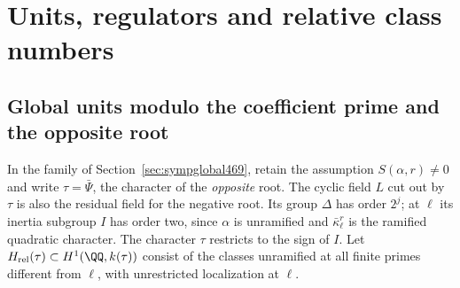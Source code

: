\documentclass[a4paper,11pt]{article}
\theoremstyle{definition}
\theoremstyle{remark}
\numberwithin{equation}{section}
\begin{document}
\section{Units, regulators and relative class numbers}\label{nav:chapter-dyadic-units-regulators}

\subsection{Global units modulo the coefficient prime and the opposite root}
\label{sec:oppositeunits472}

In the family of Section~\ref{sec:sympglobal469}, retain the
assumption \(S(\alpha,r)\ne0\) and write \(\tau=\bar\Psi\), the
character of the \emph{opposite} root. The cyclic field \(L\) cut
out by \(\tau\) is also the residual field for the negative root.
Its group \(\Delta\) has order \(2^j\); at \(\ell\) its inertia
subgroup \(I\) has order two, since \(\alpha\) is unramified and
\(\bar\kappa_\ell^r\) is the ramified quadratic character. The
character \(\tau\) restricts to the sign of \(I\). Let
\(H_{\rm rel}(\tau)\subset H^1(\QQ,k(\tau))\) consist of the
classes unramified at all finite primes different from \(\ell\),
with unrestricted localization at \(\ell\).
\end{document}
